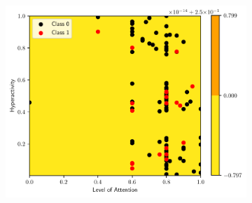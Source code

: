 \begin{figure}
\begin{subfigure}[b]{0.32\textwidth}
    \caption{}
  \end{subfigure}
  \begin{subfigure}[b]{0.32\textwidth}
    \centering \includegraphics[width=\textwidth]{figs/tree-contour-0-5.pdf}
    \caption{}
  \end{subfigure}


\end{figure}
